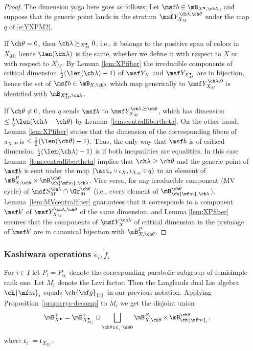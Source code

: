 \documentclass[final]{amsart}
\theoremstyle{remark}
\theoremstyle{definition}
\DeclareMathOperator*{\xt}{\times}
\numberwithin{equation}{section}
\begin{document}
\begin{proof}
The dimension yoga here goes as follows: 
Let $\msf b \in \mB_{X^\bullet, \ch\lambda}$, and suppose that its generic point lands in the stratum $\msf Y^{\ch\lambda,\ch\theta}_{X_M}$ under the map $q$ of \eqref{e:YXPM2}.

If $\ch\theta =0$, then $\ch\lambda \succeq_{X_M^\bullet} 0$, i.e., it belongs to the positive span of colors in $X_M$, hence $\len(\ch\lambda)$ is the same, whether we define it with respect to $X$ or with respect to $X_M$. By Lemma \ref{lem:XPfiber} the irreducible components of critical dimension $\frac{1}{2} (\len(\ch\lambda) - 1)$ of $\msf Y_X$ and $\msf Y_{X_M^\bullet}$ are in bijection, hence the set of $\msf b \in \mB_{X,\ch\lambda}$ which map generically to $\msf Y^{\ch\lambda,0}_{X_M}$ is identified with $\mB_{X_M^\bullet,\ch\lambda}$.

If $\ch\theta \ne 0$, then $q$ sends $\msf b$ to $\msf Y^{\ch\lambda, \succeq \ch\theta}_{X_M}$, 
which has dimension $\le \frac 1 2 \len(\ch\lambda-\ch\theta)$ by Lemma~\ref{lem:centralfibertheta}. 
On the other hand, Lemma \ref{lem:XPfiber} states that the dimension of the corresponding fibers of $\pi_{X,P}$ is $\le \frac{1}{2} (\len(\ch\theta)-1)$. Thus, the only way that $\msf b$ is of critical dimension $\frac{1}{2} (\len(\ch\lambda)-1)$ is if both inequalities are equalities. 
In this case Lemma~\ref{lem:centralfibertheta} implies that $\ch\lambda \ge \ch\theta$ 
and the generic point of $\msf b$ is sent under the map $(\act_v\circ \iota_X,\iota_{X_M}\circ q)$ to an element of $\mB^P_{X,\ch\theta} \xt \mB_{\ch{\mf m}, \ch\lambda}^{\ch\theta}$. Vice versa, for any irreducible component (MV cycle) of  $\msf S^{\ch\lambda}_M\cap \Gr_M^{\ch\theta}$ (i.e., every element of $\mB_{\ch{\mf m},\ch\lambda}^{\ch\theta}$), 
Lemma~\ref{lem:MVcentralfiber} guarantees that it corresponds to a component $\msf b'$ of $\msf Y_{X_M}^{\ch\lambda,\ch\theta}$ of the same dimension, and Lemma \ref{lem:XPfiber} ensures that the components of $\msf Y^{\ch\lambda}_X$ of critical dimension in the preimage of $\msf b'$ are in canonical bijection with $\mB^P_{X,\ch\theta}$.
\end{proof}


\subsubsection{Kashiwara operations $\tilde e_i, \tilde f_i$} \label{sect:crystal-ef}
For $i\in I$ let $P_i = P_{\alpha_i}$ denote the corresponding parabolic subgroup of semisimple rank one.
 Let $M_i$ denote the Levi factor. Then the Langlands 
dual Lie algebra $\ch{\mf m}_i$ equals $\ch{\mf g}_{\{i\}}$ in our previous notation.
Applying Proposition~\ref{prop:crys-decomp} to $M_i$ we get 
the disjoint union
\[ \mB^+_{X^\bullet} = \mB^+_{X_{M_i}^\bullet} \sqcup \bigsqcup_{\ch\theta \in \mathfrak c_i^-\sm 0} \mB^{P_i}_{X,\ch\theta} \xt \mB^{\ch\theta}_{\ch{\mf m}_i},
\]
where $\mathfrak c_i^- = \mathfrak c_{X_{M_i}}^-$.
\end{document}
